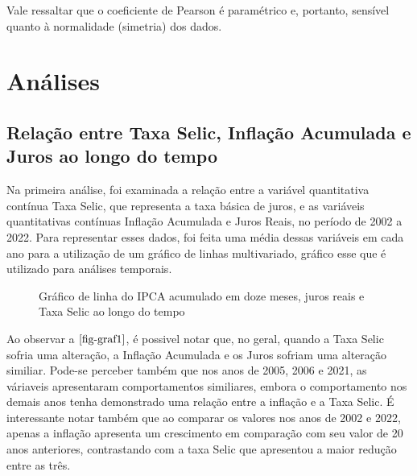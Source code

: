 \documentclass[
]{estat/estat}
\let\oldsection\section
\renewcommand\section{\clearpage\oldsection}
\begin{document}
Vale ressaltar que o coeficiente de Pearson é paramétrico e, portanto,
sensível quanto à normalidade (simetria) dos dados.

\section{Análises}\label{anuxe1lises}

\subsection{Relação entre Taxa Selic, Inflação Acumulada e Juros ao
longo do
tempo}\label{relauxe7uxe3o-entre-taxa-selic-inflauxe7uxe3o-acumulada-e-juros-ao-longo-do-tempo}

Na primeira análise, foi examinada a relação entre a variável
quantitativa contínua Taxa Selic, que representa a taxa básica de juros,
e as variáveis quantitativas contínuas Inflação Acumulada e Juros Reais,
no período de 2002 a 2022. Para representar esses dados, foi feita uma
média dessas variáveis em cada ano para a utilização de um gráfico de
linhas multivariado, gráfico esse que é utilizado para análises
temporais.

\begin{figure}[H]

\caption{\label{fig-graf1}Gráfico de linha do IPCA acumulado em doze
meses, juros reais e Taxa Selic ao longo do tempo}


\end{figure}%

Ao observar a \(\ref{fig-graf1}\), é possivel notar que, no geral,
quando a Taxa Selic sofria uma alteração, a Inflação Acumulada e os
Juros sofriam uma alteração similiar. Pode-se perceber também que nos
anos de 2005, 2006 e 2021, as váriaveis apresentaram comportamentos
similiares, embora o comportamento nos demais anos tenha demonstrado uma
relação entre a inflação e a Taxa Selic. É interessante notar também que
ao comparar os valores nos anos de 2002 e 2022, apenas a inflação
apresenta um crescimento em comparação com seu valor de 20 anos
anteriores, contrastando com a taxa Selic que apresentou a maior redução
entre as três.
\end{document}
